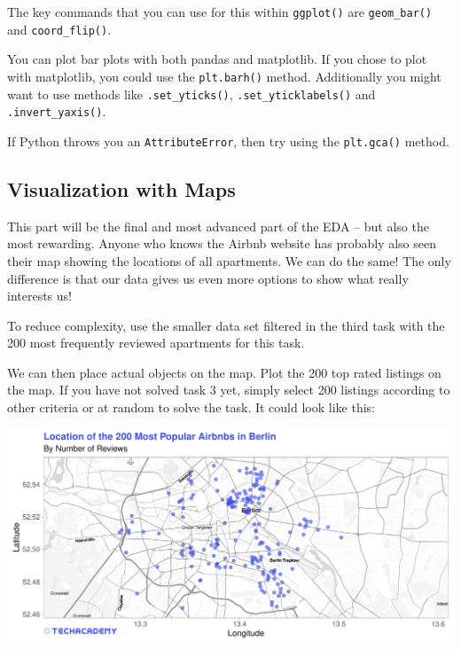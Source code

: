\documentclass[
  11pt,
]{article}
\newenvironment{tips}[1]
  {
  \begin{itemize}
  \footnotesize
  \renewcommand{\labelitemi}{
    \raisebox{-.7\height}[0pt][0pt]{
      {\setkeys{Gin}{width=3em,keepaspectratio}
        \texttt{[image: images/\#1.png]}}
    }
  }
  \setlength{\fboxsep}{1em}
  \begin{rbox}
  \item
  }
  {
  \end{rbox}
  \end{itemize}
  }
\newenvironment{tipsp}[1]
  {
  \begin{itemize}
  \footnotesize
  \renewcommand{\labelitemi}{
    \raisebox{-.7\height}[0pt][0pt]{
      {\setkeys{Gin}{width=3em,keepaspectratio}
        \texttt{[image: images/\#1.png]}}
    }
  }
  \setlength{\fboxsep}{1em}
  \begin{pbox}
  \item
  }
  {
  \end{pbox}
  \end{itemize}
  }
\begin{document}
\begin{tips}r

The key commands that you can use for this within \texttt{ggplot()} are \texttt{geom\_bar()} and \texttt{coord\_flip()}.

\end{tips}

\begin{tipsp}p

You can plot bar plots with both pandas and matplotlib.
If you chose to plot with matplotlib, you could use the \texttt{plt.barh()} method. Additionally you might want to use methods like \texttt{.set\_yticks()}, \texttt{.set\_yticklabels()} and \texttt{.invert\_yaxis()}.

If Python throws you an \texttt{AttributeError}, then try using the \texttt{plt.gca()} method.

\end{tipsp}

\hypertarget{visualization-with-maps}{%
\subsection{Visualization with Maps}\label{visualization-with-maps}}

This part will be the final and most advanced part of the EDA -- but also the most rewarding. Anyone who knows the Airbnb website has probably also seen their map showing the locations of all apartments. We can do the same! The only difference is that our data gives us even more options to show what really interests us!

To reduce complexity, use the smaller data set filtered in the third task with the 200 most frequently reviewed apartments for this task.

We can then place actual objects on the map. Plot the 200 top rated listings on the map. If you have not solved task 3 yet, simply select 200 listings according to other criteria or at random to solve the task. It could look like this:

\begin{center}\includegraphics[width=1\linewidth]{plot/4_1_map_top200_simple} \end{center}
\end{document}
